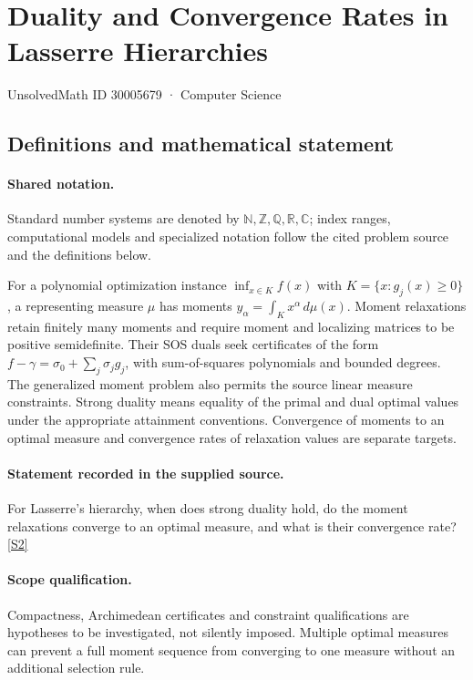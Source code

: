 \documentclass[11pt]{article}
\newcommand{\sref}[2]{\hyperlink{source:#1:#2}{[S#2]}}
\begin{document}
\setcounter{section}{30005678}
\section{Duality and Convergence Rates in Lasserre Hierarchies}\label{30005679}
{\small\sffamily UnsolvedMath ID 30005679 · Computer Science}
\subsection{Definitions and mathematical statement}

\paragraph{Shared notation.}Standard number systems are denoted by $\mathbb N,\mathbb Z,\mathbb Q,\mathbb R,\mathbb C$; index ranges, computational models and specialized notation follow the cited problem source and the definitions below.


For a polynomial optimization instance $\inf_{x\in K}f(x)$ with $K=\{x:g_j(x)\geq0\}$, a representing measure $\mu$ has moments $y_\alpha=\int_K x^\alpha\,d\mu(x)$. Moment relaxations retain finitely many moments and require moment and localizing matrices to be positive semidefinite. Their SOS duals seek certificates of the form $f-\gamma=\sigma_0+\sum_j\sigma_jg_j$, with sum-of-squares polynomials and bounded degrees. The generalized moment problem also permits the source linear measure constraints. Strong duality means equality of the primal and dual optimal values under the appropriate attainment conventions. Convergence of moments to an optimal measure and convergence rates of relaxation values are separate targets.
\paragraph{Statement recorded in the supplied source.}
For Lasserre's hierarchy, when does strong duality hold, do the moment relaxations converge to an optimal measure, and what is their convergence rate? \sref{30005679}{2}
\paragraph{Scope qualification.}
Compactness, Archimedean certificates and constraint qualifications are hypotheses to be investigated, not silently imposed. Multiple optimal measures can prevent a full moment sequence from converging to one measure without an additional selection rule.
\end{document}
